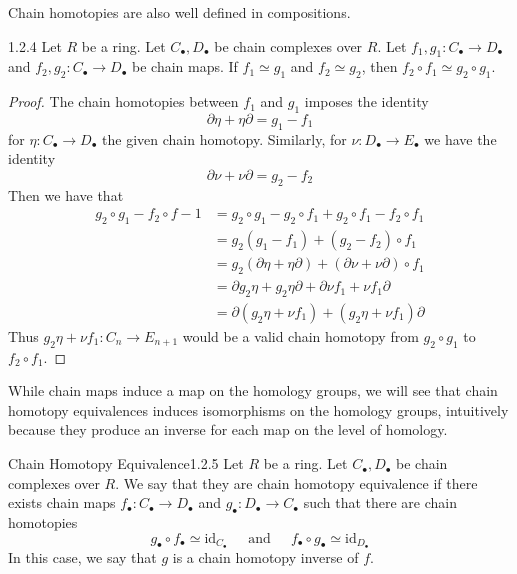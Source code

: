 \documentclass[a4paper]{article}
\begin{document}
Chain homotopies are also well defined in compositions. 

\begin{prp}{}{1.2.4} Let $R$ be a ring. Let $C_\bullet,D_\bullet$ be chain complexes over $R$. Let $f_1,g_1:C_\bullet\to D_\bullet$ and $f_2,g_2:C_\bullet\to D_\bullet$ be chain maps. If $f_1\simeq g_1$ and $f_2\simeq g_2$, then $f_2\circ f_1\simeq g_2\circ g_1$. \tcbline
\begin{proof}
The chain homotopies between $f_1$ and $g_1$ imposes the identity $$\partial\eta+\eta\partial=g_1-f_1$$ for $\eta:C_\bullet\to D_\bullet$ the given chain homotopy. Similarly, for $\nu:D_\bullet\to E_\bullet$ we have the identity $$\partial\nu+\nu\partial=g_2-f_2$$ Then we have that 
\begin{align*}
g_2\circ g_1-f_2\circ f-1&=g_2\circ g_1-g_2\circ f_1+g_2\circ f_1-f_2\circ f_1\\
&=g_2(g_1-f_1)+(g_2-f_2)\circ f_1\\
&=g_2(\partial\eta+\eta\partial)+(\partial\nu+\nu\partial)\circ f_1\\
&=\partial g_2\eta+g_2\eta\partial+\partial\nu f_1+\nu f_1\partial\\
&=\partial(g_2\eta+\nu f_1)+(g_2\eta+\nu f_1)\partial
\end{align*}
Thus $g_2\eta+\nu f_1:C_n\to E_{n+1}$ would be a valid chain homotopy from $g_2\circ g_1$ to $f_2\circ f_1$. 
\end{proof}
\end{prp}

While chain maps induce a map on the homology groups, we will see that chain homotopy equivalences induces isomorphisms on the homology groups, intuitively because they produce an inverse for each map on the level of homology. 

\begin{defn}{Chain Homotopy Equivalence}{1.2.5} Let $R$ be a ring. Let $C_\bullet,D_\bullet$ be chain complexes over $R$. We say that they are chain homotopy equivalence if there exists chain maps $f_\bullet:C_\bullet\to D_\bullet$ and $g_\bullet:D_\bullet\to C_\bullet$ such that there are chain homotopies $$g_\bullet\circ f_\bullet\simeq\text{id}_{C_\bullet}\;\;\;\;\text{ and }\;\;\;\;f_\bullet\circ g_\bullet\simeq\text{id}_{D_\bullet}$$ In this case, we say that $g$ is a chain homotopy inverse of $f$. 
\end{defn}
\end{document}
